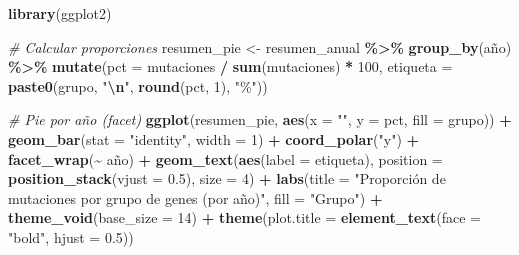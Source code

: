\documentclass[
]{article}
\newenvironment{Shaded}{\begin{snugshade}}{\end{snugshade}}
\newcommand{\AttributeTok}[1]{\textcolor[rgb]{0.13,0.29,0.53}{#1}}
\newcommand{\CommentTok}[1]{\textcolor[rgb]{0.56,0.35,0.01}{\textit{#1}}}
\newcommand{\DecValTok}[1]{\textcolor[rgb]{0.00,0.00,0.81}{#1}}
\newcommand{\FloatTok}[1]{\textcolor[rgb]{0.00,0.00,0.81}{#1}}
\newcommand{\FunctionTok}[1]{\textcolor[rgb]{0.13,0.29,0.53}{\textbf{#1}}}
\newcommand{\NormalTok}[1]{#1}
\newcommand{\OtherTok}[1]{\textcolor[rgb]{0.56,0.35,0.01}{#1}}
\newcommand{\SpecialCharTok}[1]{\textcolor[rgb]{0.81,0.36,0.00}{\textbf{#1}}}
\newcommand{\StringTok}[1]{\textcolor[rgb]{0.31,0.60,0.02}{#1}}
\begin{document}
\begin{Shaded}
\begin{Highlighting}[]
\FunctionTok{library}\NormalTok{(ggplot2)}

\CommentTok{\# Calcular proporciones}
\NormalTok{resumen\_pie }\OtherTok{\textless{}{-}}\NormalTok{ resumen\_anual }\SpecialCharTok{\%\textgreater{}\%}
  \FunctionTok{group\_by}\NormalTok{(año) }\SpecialCharTok{\%\textgreater{}\%}
  \FunctionTok{mutate}\NormalTok{(}\AttributeTok{pct =}\NormalTok{ mutaciones }\SpecialCharTok{/} \FunctionTok{sum}\NormalTok{(mutaciones) }\SpecialCharTok{*} \DecValTok{100}\NormalTok{,}
         \AttributeTok{etiqueta =} \FunctionTok{paste0}\NormalTok{(grupo, }\StringTok{"}\SpecialCharTok{\textbackslash{}n}\StringTok{"}\NormalTok{, }\FunctionTok{round}\NormalTok{(pct, }\DecValTok{1}\NormalTok{), }\StringTok{"\%"}\NormalTok{))}

\CommentTok{\# Pie por año (facet)}
\FunctionTok{ggplot}\NormalTok{(resumen\_pie, }\FunctionTok{aes}\NormalTok{(}\AttributeTok{x =} \StringTok{""}\NormalTok{, }\AttributeTok{y =}\NormalTok{ pct, }\AttributeTok{fill =}\NormalTok{ grupo)) }\SpecialCharTok{+}
  \FunctionTok{geom\_bar}\NormalTok{(}\AttributeTok{stat =} \StringTok{"identity"}\NormalTok{, }\AttributeTok{width =} \DecValTok{1}\NormalTok{) }\SpecialCharTok{+}
  \FunctionTok{coord\_polar}\NormalTok{(}\StringTok{"y"}\NormalTok{) }\SpecialCharTok{+}
  \FunctionTok{facet\_wrap}\NormalTok{(}\SpecialCharTok{\textasciitilde{}}\NormalTok{ año) }\SpecialCharTok{+}
  \FunctionTok{geom\_text}\NormalTok{(}\FunctionTok{aes}\NormalTok{(}\AttributeTok{label =}\NormalTok{ etiqueta), }\AttributeTok{position =} \FunctionTok{position\_stack}\NormalTok{(}\AttributeTok{vjust =} \FloatTok{0.5}\NormalTok{), }\AttributeTok{size =} \DecValTok{4}\NormalTok{) }\SpecialCharTok{+}
  \FunctionTok{labs}\NormalTok{(}\AttributeTok{title =} \StringTok{"Proporción de mutaciones por grupo de genes (por año)"}\NormalTok{, }\AttributeTok{fill =} \StringTok{"Grupo"}\NormalTok{) }\SpecialCharTok{+}
  \FunctionTok{theme\_void}\NormalTok{(}\AttributeTok{base\_size =} \DecValTok{14}\NormalTok{) }\SpecialCharTok{+}
  \FunctionTok{theme}\NormalTok{(}\AttributeTok{plot.title =} \FunctionTok{element\_text}\NormalTok{(}\AttributeTok{face =} \StringTok{"bold"}\NormalTok{, }\AttributeTok{hjust =} \FloatTok{0.5}\NormalTok{))}
\end{Highlighting}
\end{Shaded}
\end{document}
